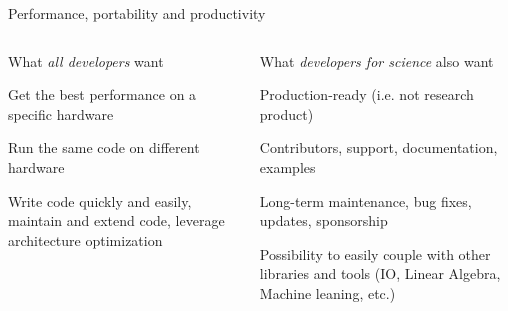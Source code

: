 \documentclass[aspectratio=169]{beamer}
\begin{document}
\begin{frame}{Performance, portability and productivity}
    \begin{columns}[T]
        \begin{column}{0.45\linewidth}
            What \emph{all developers} want

            \vspace{1em}

            \begin{description}[Performance]
                \item[Performance] Get the best performance on a specific hardware
                \item[Portability] Run the same code on different hardware
                \item[Productivity] Write code quickly and easily, maintain and extend code, leverage architecture optimization
            \end{description}
        \end{column}
        \begin{column}{0.55\linewidth}
            What \emph{developers for science} also want

            \vspace{1em}

            \begin{description}[Interporability]
                \item[Maturity] Production-ready (i.e. not research product)
                \item[Community] Contributors, support, documentation, examples
                \item[Longevity] Long-term maintenance, bug fixes, updates, sponsorship
                \item[Interporability] Possibility to easily couple with other libraries and tools (IO, Linear Algebra, Machine leaning, etc.)
            \end{description}
        \end{column}
    \end{columns}
\end{frame}

\end{document}
